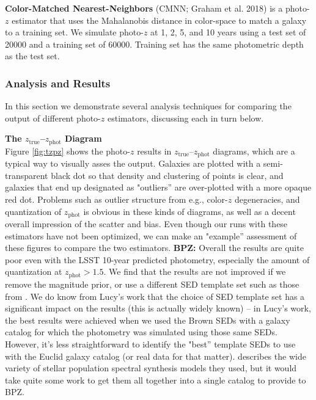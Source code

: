 \documentclass[DM,lsstdraft,toc]{lsstdoc}
\begin{document}
\textbf{Color-Matched Nearest-Neighbors} (CMNN; Graham et al. 2018) is a photo-$z$ estimator that uses the Mahalanobis distance in color-space to match a galaxy to a training set. We simulate photo-$z$ at 1, 2, 5, and 10 years using a test set of 20000 and a training set of 60000. Training set has the same photometric depth as the test set.


\subsubsection{Analysis and Results}\label{sssec:eval_ex_comp}

In this section we demonstrate several analysis techniques for comparing the output of different photo-$z$ estimators, discussing each in turn below.

\smallskip \noindent \textbf{The $z_\mathrm{true}$--$z_\mathrm{phot}$ Diagram} \\
Figure \ref{fig:tzpz} shows the photo-$z$ results in $z_\mathrm{true}$--$z_\mathrm{phot}$ diagrams, which are a typical way to visually asses the output. Galaxies are plotted with a semi-transparent black dot so that density and clustering of points is clear, and galaxies that end up designated as "outliers'' are over-plotted with a more opaque red dot. Problems such as outlier structure from e.g., color-$z$ degeneracies, and quantization of $z_\mathrm{phot}$ is obvious in these kinds of diagrams, as well as a decent overall impression of the scatter and bias. Even though our runs with these estimators have not been optimized, we can make an "example'' assessment of these figures to compare the two estimators.
\textbf{BPZ:} Overall the results are quite poor even with the LSST 10-year predicted photometry, especially the amount of quantization at $z_\mathrm{phot}>1.5$. We find that the results are not improved if we remove the magnitude prior, or use a different SED template set such as those from \cite{2014ApJS..212...18B}. We do know from Lucy's work that the choice of SED template set has a significant impact on the results (this is actually widely known) -- in Lucy's work, the best results were achieved when we used the Brown SEDs with a galaxy catalog for which the photometry was simulated using those same SEDs. However, it's less straightforward to identify the "best'' template SEDs to use with the Euclid galaxy catalog (or real data for that matter). \cite{2014MNRAS.439..264G} describes the wide variety of stellar population spectral synthesis models they used, but it would take quite some work to get them all together into a single catalog to provide to BPZ.
\end{document}
